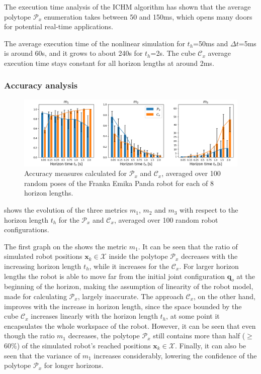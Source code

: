 The execution time analysis of the ICHM algorithm has shown that the average polytope $\mathcal{P}_x$ enumeration takes between 50 and 150ms, which opens many doors for potential real-time applications. 

The average execution time of the nonlinear simulation for $t_h$=50ms and $\Delta t$=5ms is around 60s, and it grows to about 240s for $t_h$=2s. The cube $\mathcal{C}_x$ average execution time stays constant for all horizon lengths at around 2ms.


\subsubsection*{Accuracy analysis}

\begin{figure}[!t]
    \centering
    \includegraphics[width=\textwidth]{Papers/images/metrics_results_double.png}
    \caption{Accuracy measures calculated for $\mathcal{P}_x$ and $\mathcal{C}_x$, averaged over 100 random poses of the Franka Emika Panda robot for each of 8 horizon lengths.}
    \label{fig:accuracy}
    
\end{figure}
 shows the evolution of the three metrics $m_1$, $m_2$ and $m_3$ with respect to the horizon length $t_h$ for the $\mathcal{P}_x$ and $\mathcal{C}_x$, averaged over 100 random robot configurations. 

The first graph on the  shows the metric $m_1$. It can be seen that the ratio of simulated robot positions $\bm{x}_k \in \mathcal{X}$ inside the polytope $\mathcal{P}_x$ decreases with the increasing horizon length $t_h$, while it increases for the $\mathcal{C}_x$. For larger horizon lengths the robot is able to move far from the initial joint configuration $\bm{q}_o$ at the beginning of the horizon, making the assumption of linearity of the robot model, made for calculating $\mathcal{P}_x$, largely inaccurate. The approach $\mathcal{C}_x$, on the other hand, improves with the increase in horizon length, since the space bounded by the cube $\mathcal{C}_x$ increases linearly with the horizon length $t_h$, at some point it encapsulates the whole workspace of the robot. However, it can be seen that even though the ratio $m_1$ decreases, the polytope $\mathcal{P}_x$ still contains more than half ($\geq$60\%) of the simulated robot's reached positions $\bm{x}_k\in\mathcal{X}$. Finally, it can also be seen that the variance of $m_1$ increases considerably, lowering the confidence of the polytope $\mathcal{P}_x$ for longer horizons.

